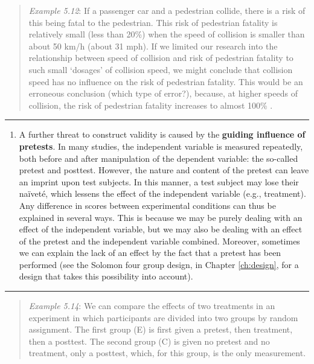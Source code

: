 \documentclass[
]{book}
\providecommand{\tightlist}{%
  \setlength{\itemsep}{0pt}\setlength{\parskip}{0pt}}
\begin{document}
\begin{quote}
\emph{Example 5.12}: If a passenger car and a pedestrian collide, there is a risk of this being fatal to the pedestrian. This risk of pedestrian fatality is relatively small (less than 20\%) when the speed of collision is smaller than about 50 km/h (about 31 mph). If we limited our research into the relationship between speed of collision and risk of pedestrian fatality to such small `dosages' of collision speed, we might conclude that collision speed has no influence on the risk of pedestrian fatality. This would be an erroneous conclusion (which type of error?), because, at higher speeds of collision, the risk of pedestrian fatality increases to almost 100\% \citep{Rosen11, SWOV12}.
\end{quote}

\begin{center}\rule{0.5\linewidth}{0.5pt}\end{center}

\begin{enumerate}
\def\labelenumi{\arabic{enumi}.}
\setcounter{enumi}{4}
\tightlist
\item
  A further threat to construct validity is caused by the \textbf{guiding influence of pretests}. In many studies, the independent variable is measured repeatedly, both before and after manipulation of the dependent variable: the so-called pretest and posttest. However, the nature and content of the pretest can leave an imprint upon test subjects. In this manner, a test subject may lose their naïveté, which lessens the effect of the independent variable (e.g., treatment). Any difference in scores between experimental conditions can thus be explained in several ways. This is because we may be purely dealing with an effect of the independent variable, but we may also be dealing with an effect of the pretest and the independent variable combined. Moreover, sometimes we can explain the lack of an effect by the fact that a pretest has been performed
  (see the Solomon four group design, in Chapter \ref{ch:design},
  for a design that takes this possibility into account).
\end{enumerate}

\begin{center}\rule{0.5\linewidth}{0.5pt}\end{center}

\begin{quote}
\emph{Example 5.14}: We can compare the effects of two treatments in an experiment in which participants are divided into two groups by random assignment. The first group (E) is first given a pretest, then treatment, then a posttest. The second group (C) is given no pretest and no treatment, only a posttest, which, for this group, is the only measurement.
\end{quote}
\end{document}
